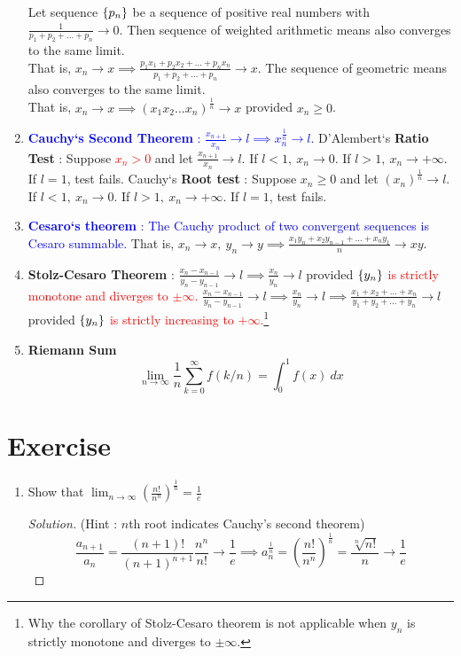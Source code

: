 \begin{enumerate}
	\subitem Let sequence $\{p_n\}$ be a sequence of positive real numbers with $\frac{1}{p_1+p_2+\dots+p_n} \to 0$. Then sequence of weighted arithmetic means also converges to the same limit.\\ That is, $x_n \to x \implies \frac{p_1x_1 + p_2x_2 + \dots + p_nx_n}{p_1+p_2+\dots+p_n} \to x$.
		\subitem The sequence of geometric means also converges to the same limit.\\ That is, $x_n \to x \implies (x_1x_2\dots x_n)^\frac{1}{n} \to x$ provided $x_n \ge 0$.
	\item \textcolor{blue}{\textbf{Cauchy`s Second Theorem} : $ \frac{x_{n+1}}{x_n} \to l \implies x_n^\frac{1}{n} \to l$.}
		\subitem D'Alembert`s \textbf{Ratio Test} : Suppose \textcolor{red}{$x_n > 0$} and let $\frac{x_{n+1}}{x_n} \to l$.
		If $l < 1,\ x_n \to 0$. If $l > 1,\ x_n \to +\infty$. If $l = 1$, test fails.
		\subitem Cauchy`s \textbf{Root test} : Suppose $x_n \ge 0$ and let $ (x_n)^{\frac{1}{n}} \to l$.
		If $l < 1,\ x_n \to 0$. If $l > 1,\ x_n \to +\infty$. If $l = 1$, test fails.
	\item \textcolor{blue}{\textbf{Cesaro`s theorem} : The Cauchy product of two convergent sequences is Cesaro summable.} That is, $x_n \to x,\ y_n \to y \implies \frac{x_1y_n + x_2y_{n-1} + \dots + x_ny_1}{n} \to xy$.
	\item \textbf{Stolz-Cesaro Theorem} : $\frac{x_n-x_{n-1}}{y_n-y_{n-1}} \to l \implies \frac{x_n}{y_n} \to l$ provided \textcolor{red}{$\{y_n\}$ is strictly monotone and diverges to $\pm \infty$.}
		\subitem $\frac{x_n-x_{n-1}}{y_n-y_{n-1}} \to l \implies \frac{x_n}{y_n} \to l \implies \frac{x_1+x_2+\dots+x_n}{y_1+y_2+\dots+y_n} \to l$ provided \textcolor{red}{$\{y_n\}$ is strictly increasing to $+\infty$.}\footnote{Why the corollary of Stolz-Cesaro theorem is not applicable when $y_n$ is strictly monotone and diverges to $\pm \infty$.}
	\item \textbf{Riemann Sum}
		\[ \lim_{n \to \infty} \frac{1}{n} \sum_{k=0}^\infty f(k/n) = \int_0^1 f(x)\ dx \]
\end{enumerate}

\section{Exercise}
\begin{enumerate}
	\item Show that $\displaystyle \lim_{n \to \infty} \left( \frac{n!}{n^n} \right)^\frac{1}{n} = \frac{1}{e}$ 
		\begin{proof}[Solution] (Hint : $n$th root indicates Cauchy's second theorem)
			$$ \frac{a_{n+1}}{a_n} = \frac{(n+1)!}{(n+1)^{n+1}} \frac{n^n}{n!} \to \frac{1}{e} \implies a_n^\frac{1}{n} = \left(\frac{n!}{n^n}\right)^\frac{1}{n} = \frac{\sqrt[n]{n!}}{n} \to \frac{1}{e} $$
		\end{proof}
\end{enumerate}


